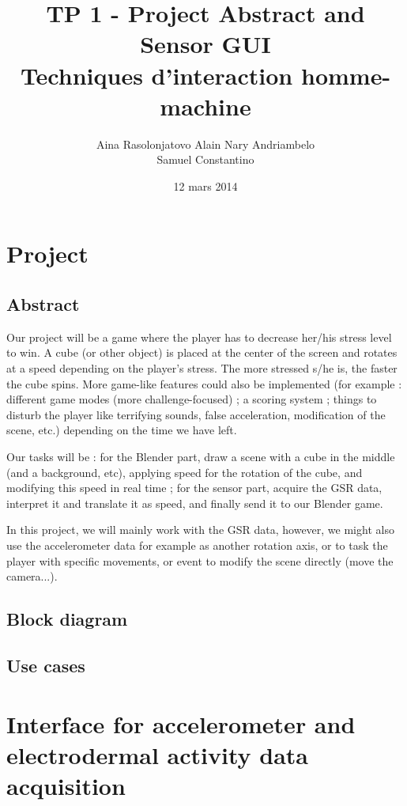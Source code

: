 \documentclass[12pt,a4paper]{article}
\title{\LARGE \textbf{TP 1 - Project Abstract and Sensor GUI}\\
	\bigskip
	\bigskip
	\large Techniques d'interaction homme-machine}
\author{Aina Rasolonjatovo Alain Nary Andriambelo \\ Samuel Constantino}
\date{12 mars 2014}
\begin{document}
	\maketitle


\section{Project}

\subsection{Abstract}

Our project will be a game where the player has to decrease her/his stress level to win. A cube (or other object) is placed at the center of the screen and rotates at a speed depending on the player's stress. The more stressed s/he is, the faster the cube spins. More game-like features could also be implemented (for example : different game modes (more challenge-focused) ; a scoring system ; things to disturb the player like terrifying sounds, false acceleration, modification of the scene, etc.) depending on the time we have left.

Our tasks will be : for the Blender part, draw a scene with a cube in the middle (and a background, etc), applying speed for the rotation of the cube, and modifying this speed in real time ; for the sensor part, acquire the GSR data, interpret it and translate it as speed, and finally send it to our Blender game. 

In this project, we will mainly work with the GSR data, however, we might also use the accelerometer data for example as another rotation axis, or to task the player with specific movements, or event to modify the scene directly (move the camera...).

\subsection{Block diagram}



\subsection{Use cases}

\section{Interface for accelerometer and electrodermal activity 
 data acquisition}
\end{document}
